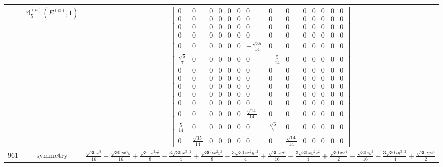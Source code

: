 \documentclass[fleqn,8pt,landscape]{jsarticle}
\begin{document}
\begin{longtable}{ccc}
$  $ & $ \mathbb{M}_{5}^{(a)}(E^{(a)},1) $ & $ \begin{bmatrix} 0 & 0 & 0 & 0 & 0 & 0 & 0 & 0 & 0 & 0 & 0 & 0 & 0 & 0 \\ 0 & 0 & 0 & 0 & 0 & 0 & 0 & 0 & 0 & 0 & 0 & 0 & 0 & 0 \\ 0 & 0 & 0 & 0 & 0 & 0 & 0 & 0 & 0 & 0 & 0 & 0 & 0 & 0 \\ 0 & 0 & 0 & 0 & 0 & 0 & 0 & 0 & 0 & 0 & 0 & 0 & 0 & 0 \\ 0 & 0 & 0 & 0 & 0 & 0 & - \frac{\sqrt{35}}{14} & 0 & 0 & 0 & 0 & 0 & 0 & 0 \\ \frac{\sqrt{6}}{7} & 0 & 0 & 0 & 0 & 0 & 0 & - \frac{5}{14} & 0 & 0 & 0 & 0 & 0 & 0 \\ 0 & 0 & 0 & 0 & 0 & 0 & 0 & 0 & 0 & 0 & 0 & 0 & 0 & 0 \\ 0 & 0 & 0 & 0 & 0 & 0 & 0 & 0 & 0 & 0 & 0 & 0 & 0 & 0 \\ 0 & 0 & 0 & 0 & 0 & 0 & 0 & 0 & 0 & 0 & 0 & 0 & 0 & 0 \\ 0 & 0 & 0 & 0 & 0 & 0 & 0 & 0 & 0 & 0 & 0 & 0 & 0 & 0 \\ 0 & 0 & 0 & 0 & 0 & 0 & 0 & 0 & 0 & 0 & 0 & 0 & 0 & 0 \\ 0 & 0 & 0 & 0 & 0 & 0 & \frac{\sqrt{14}}{14} & 0 & 0 & 0 & 0 & 0 & 0 & 0 \\ \frac{5}{14} & 0 & 0 & 0 & 0 & 0 & 0 & \frac{\sqrt{6}}{7} & 0 & 0 & 0 & 0 & 0 & 0 \\ 0 & \frac{\sqrt{35}}{14} & 0 & 0 & 0 & 0 & 0 & 0 & \frac{\sqrt{14}}{14} & 0 & 0 & 0 & 0 & 0 \end{bmatrix} $ \\ \hline
$ 961 $ & $ \text{symmetry} $ & $ \frac{\sqrt{30} x^{5}}{16} + \frac{\sqrt{30} i x^{4} y}{16} + \frac{\sqrt{30} x^{3} y^{2}}{8} - \frac{3 \sqrt{30} x^{3} z^{2}}{4} + \frac{\sqrt{30} i x^{2} y^{3}}{8} - \frac{3 \sqrt{30} i x^{2} y z^{2}}{4} + \frac{\sqrt{30} x y^{4}}{16} - \frac{3 \sqrt{30} x y^{2} z^{2}}{4} + \frac{\sqrt{30} x z^{4}}{2} + \frac{\sqrt{30} i y^{5}}{16} - \frac{3 \sqrt{30} i y^{3} z^{2}}{4} + \frac{\sqrt{30} i y z^{4}}{2} $ \\

\end{longtable}
\end{document}
